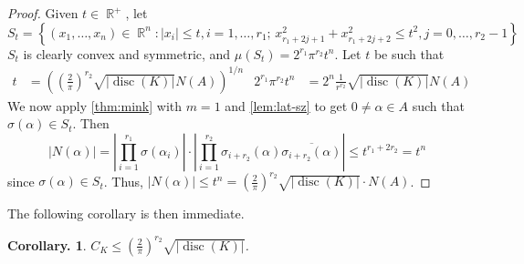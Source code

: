 \documentclass[11pt, a4paper]{memoir}
\DeclareMathOperator{\R}{{\mathbb{R}}}
\newcommand{\ol}[1]{\ensuremath{\overline{#1}}}
\theoremstyle{change}
\newtheorem{corollary}[theorem]{Corollary.}
\theoremstyle{plain}
\theoremstyle{nonumberplain}
\newtheorem{proof}{Proof}
\DeclareMathOperator{\disc}{disc}
\numberwithin{equation}{section}
\begin{document}
\begin{proof}
    Given $t\in\R^+$, let
    \begin{equation*}
        S_t=\left\{(x_1,\ldots,x_n)\in\R^n:|x_i|\leq t,i=1,\ldots,r_1;\, x_{r_1+2j+1}^2+x_{r_1+2j+2}^2\leq t^2, j=0,\ldots,r_2-1\right\}
    \end{equation*}
    $S_t$ is clearly convex and symmetric, and $\mu(S_t)=2^{r_1}\pi^{r_2}t^n$.
    Let $t$ be such that
    \begin{align*}
        t&=\left(\left(\frac{2}{\pi}\right)^{r_2}\sqrt{|\disc(K)|}N(A)\right)^{1/n} & 2^{r_1}\pi^{r_2}t^n&=2^n\frac{1}{r^{r_2}}\sqrt{|\disc(K)|}N(A)
    \end{align*}
    We now apply \cref{thm:mink} with $m=1$ and \cref{lem:lat-sz} to get $0\neq\alpha\in A$ such that $\sigma(\alpha)\in S_t$.
    Then
    \begin{equation*}
        |N(\alpha)|=\left\lvert\prod_{i=1}^{r_1}\sigma(\alpha_i)\right\rvert\cdot\left\lvert\prod_{i=1}^{r_2}\sigma_{i+r_2}(\alpha)\ol{\sigma_{i+r_2}(\alpha)}\right\rvert
        \leq t^{r_1+2r_2}=t^n
    \end{equation*}
    since $\sigma(\alpha)\in S_t$.
    Thus, $|N(\alpha)|\leq t^n=\left(\frac{2}{\pi}\right)^{r_2}\sqrt{|\disc(K)|}\cdot N(A)$.
\end{proof}
The following corollary is then immediate.
\begin{corollary}
    $C_K\leq\left(\frac{2}{\pi}\right)^{r_2}\sqrt{|\disc(K)|}$.
\end{corollary}
\end{document}

